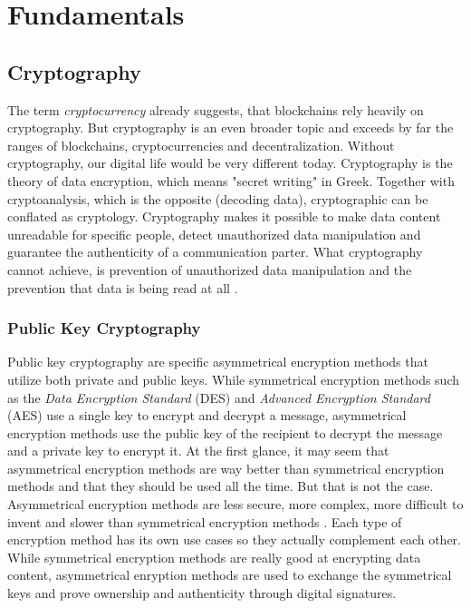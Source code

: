 \chapter{Fundamentals}
\label{cha:Fundamentals}

\section{Cryptography}

The term \textit{cryptocurrency} already suggests, that blockchains rely heavily on cryptography. But cryptography is an even broader topic and exceeds by far the ranges of blockchains, cryptocurrencies and decentralization. Without cryptography, our digital life would be very different today. Cryptography is the theory of data encryption, which means "secret writing" in Greek. Together with cryptoanalysis, which is the opposite (decoding data), cryptographic can be conflated as cryptology. Cryptography makes it possible to make data content unreadable for specific people, detect unauthorized data manipulation and guarantee the authenticity of a communication parter. What cryptography cannot achieve, is prevention of unauthorized data manipulation and the prevention that data is being read at all \cite[pp. 10-11]{Schmeh2007}.

\subsection{Public Key Cryptography}
Public key cryptography are specific asymmetrical encryption methods that utilize both private and public keys. While symmetrical encryption methods such as the \textit{Data Encryption Standard} (DES) and \textit{Advanced Encryption Standard} (AES) use a single key to encrypt and decrypt a message, asymmetrical encryption methods use the public key of the recipient to decrypt the message and a private key to encrypt it. At the first glance, it may seem that asymmetrical encryption methods are way better than symmetrical encryption methods and that they should be used all the time. But that is not the case. Asymmetrical encryption methods are less secure, more complex, more difficult to invent and slower than symmetrical encryption methods \cite[p. 172]{Schmeh2007}. Each type of encryption method has its own use cases so they actually complement each other. While symmetrical encryption methods are really good at encrypting data content, asymmetrical enryption methods are used to exchange the symmetrical keys and prove ownership and authenticity through digital signatures.

